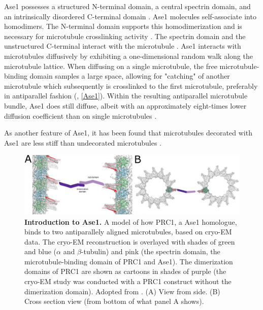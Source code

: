 Ase1 possesses a structured N-terminal domain, a central spectrin domain, and an intrinsically disordered C-terminal domain \parencite{Kapitein2008,Kellogg2016}. Ase1 molecules self-associate into homodimers. The N-terminal domain supports this homodimerization and is necessary for microtubule crosslinking activity \parencite{Janson2007}. The spectrin domain and the unstructured C-terminal interact with the microtubule \parencite{Kellogg2016}. Ase1 interacts with microtubules diffusively by exhibiting a one-dimensional random walk along the microtubule lattice. When diffusing on a single microtubule, the free microtubule-binding domain samples a large space, allowing for "catching" of another microtubule which subsequently is crosslinked to the first microtubule, preferably in antiparallel fashion (\cite{Janson2007}, \autoref{Ase1}). Within the resulting antiparallel microtubule bundle, Ase1 does still diffuse, albeit with an approximately eight-times lower diffusion coefficient than on single microtubules \parencite{lanskydiffusible2015}.\par
As another feature of Ase1, it has been found that microtubules decorated with Ase1 are less stiff than undecorated microtubules \parencite{Portran2013}.
\begin{figure}[h!tb]
\centering
\includegraphics[width=\linewidth]{Figures/Ase1.png}
\caption[Introduction to Ase1.]{
\textbf{Introduction to Ase1.} A model of how PRC1, a Ase1 homologue, binds to two antiparallely aligned microtubules, based on cryo-EM data. The cryo-EM reconstruction is overlayed with shades of green and blue ($\alpha$ and $\beta$-tubulin) and pink (the spectrin domain, the microtubule-binding domain of PRC1 and Ase1). The dimerization domains of PRC1 are shown as cartoons in shades of purple (the cryo-EM study was conducted with a PRC1 construct without the dimerization domain). Adopted from \cite{Kellogg2016}. (A) View from side. (B) Cross section view (from bottom of what panel A shows). 
	}\label{Ase1}
\end{figure}